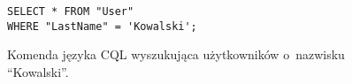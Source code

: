\begin{figure}[!ht]
\begin{verbatim}
SELECT * FROM "User"
WHERE "LastName" = 'Kowalski';
\end{verbatim}

\caption{Komenda języka CQL wyszukująca użytkowników o~nazwisku ``Kowalski''.}
\label{fig:cql:select}
\end{figure}

